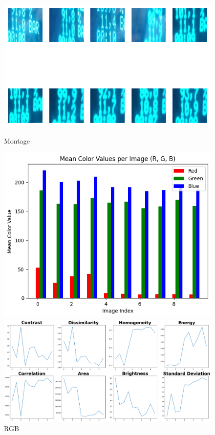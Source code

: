 \begin{figure}[ht]
    \centering
    \begin{minipage}[t]{0.25\textwidth}
        \centering
        \includegraphics[width=\textwidth]{Figures/EDA_Charts/6/montage.png}
        \caption*{Montage}
    \end{minipage}\hfill
    \begin{minipage}[t]{0.25\textwidth}
        \centering
        \includegraphics[width=\textwidth]{Figures/EDA_Charts/6/rgb.png}
        \caption*{RGB}
    \end{minipage}\hfill
    \begin{minipage}[t]{0.50\textwidth}
        \centering
        \includegraphics[width=\textwidth]{Figures/EDA_Charts/6/da.png}

\end{minipage}
\end{figure}
